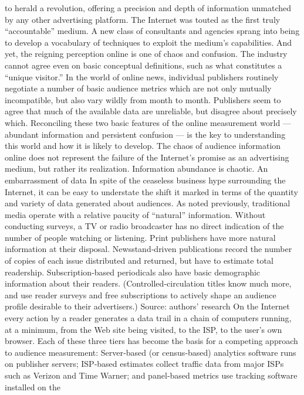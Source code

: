 to herald a revolution, offering a precision and depth of information
unmatched by any other advertising platform. The Internet was touted as
the first truly ``accountable'' medium. A new class of consultants and
agencies sprang into being to develop a vocabulary of techniques to
exploit the medium’s capabilities.
And yet, the reigning perception online is one of chaos and confusion. The
industry cannot agree even on basic conceptual definitions, such as what
constitutes a ``unique visitor.'' In the world of online news, individual
publishers routinely negotiate a number of basic audience metrics which
are not only mutually incompatible, but also vary wildly from month to
month. Publishers seem to agree that much of the available data are
unreliable, but disagree about precisely which.
Reconciling these two basic features of the online measurement world —
abundant information and persistent confusion — is the key to
understanding this world and how it is likely to develop. The chaos of
audience information online does not represent the failure of the Internet’s
promise as an advertising medium, but rather its realization. Information
abundance is chaotic.
An embarrassment of data
In spite of the ceaseless business hype surrounding the Internet, it can be
easy to understate the shift it marked in terms of the quantity and variety
of data generated about audiences. As noted previously, traditional media
operate with a relative paucity of ``natural'' information. Without
conducting surveys, a TV or radio broadcaster has no direct indication of
the number of people watching or listening.
Print publishers have more natural information at their disposal.
Newsstand‐driven publications record the number of copies of each issue
distributed and returned, but have to estimate total readership.
Subscription‐based periodicals also have basic demographic information
about their readers. (Controlled‐circulation titles know much more, and
use reader surveys and free subscriptions to actively shape an audience
profile desirable to their advertisers.)
Source: authors’ research
On the Internet every action by a reader generates a data trail in a chain of
computers running, at a minimum, from the Web site being visited, to the
ISP, to the user’s own browser. Each of these three tiers has become the
basis for a competing approach to audience measurement: Server‐based
(or census‐based) analytics software runs on publisher servers; ISP‐based
estimates collect traffic data from major ISPs such as Verizon and Time
Warner; and panel‐based metrics use tracking software installed on the
